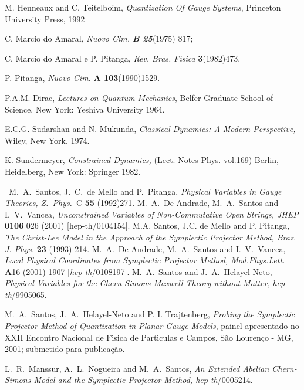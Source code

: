 \documentclass[a4paper,thmsa,12pt]{report}
\begin{document}
\begin{thebibliography}{99}

  M. Henneaux and C. Teitelboim, \textit{Quantization Of
Gauge Systems}, Princeton University Press, 1992\textit{\ }

  C. Marcio do Amaral, \textit{Nuovo Cim. \textbf{B 25}}(1975)
817;

  C. Marcio do Amaral e P. Pitanga, \textit{Rev.
Bras. F\'{\i}sica }\textbf{3}(1982)473.

  P. Pitanga, \textit{Nuovo Cim. }\textbf{A 103}(1990)1529.

  P.A.M. Dirac, \textit{Lectures on Quantum Mechanics},
Belfer Graduate School of Science, New York: Yeshiva University 1964.

  E.C.G. Sudarshan and N. Mukunda, \textit{Classical
Dynamics: A Modern Perspective, }Wiley, New York, 1974.

  K. Sundermeyer, \textit{Constrained Dynamics, }(Lect.
Notes Phys. vol.169) Berlin, Heidelberg, New York: Springer 1982.

  \textit{\ }M.~A.~Santos, J.~C.~de Mello and P.~Pitanga, 
\textit{Physical Variables in Gauge Theories, } \textit{Z.\ Phys.}\ C 
\textbf{55} (1992)271.
  M.~A.~De Andrade, M.~A.~Santos and I.~V.~Vancea, \textit{%
Unconstrained Variables of Non-Commutative Open Strings, JHEP} \textbf{0106} 
026 (2001) [hep-th/0104154].
  M.A. Santos, J.C. de Mello and P. Pitanga, \textit{The
Christ-Lee Model in the Approach of the Symplectic Projector Method, Braz.
J. Phys.} \textbf{23} (1993) 214.
  M.~A.~De Andrade, M.~A.~Santos and I.~V.~Vancea, \textit{%
Local Physical Coordinates from Symplectic Projector Method, Mod.Phys.Lett.}
{\textbf A16} (2001) 1907 [\textit{hep-th}/0108197].
  M.~A.~Santos and J.~A.~Helayel-Neto, \textit{Physical
Variables for the Chern-Simons-Maxwell Theory without Matter, } \textit{%
hep-th}/9905065.

 M.~A.~Santos, J.~A.~Helayel-Neto and P. I. Trajtenberg, 
{\it Probing the Symplectic Projector Method of Quantization in Planar Gauge Models},
painel apresentado no XXII Encontro Nacional de F\'{\i}sica de Part\'{\i}culas e Campos,
S\~ao Louren\c co - MG, 2001; submetido para publica\c c\~ao.

  L.~R.~Manssur, A.~L.~Nogueira and M.~A.~Santos, 
\textit{An Extended Abelian Chern-Simons Model and the Symplectic Projector
Method, hep-th}/0005214.


\end{thebibliography}
\end{document}
